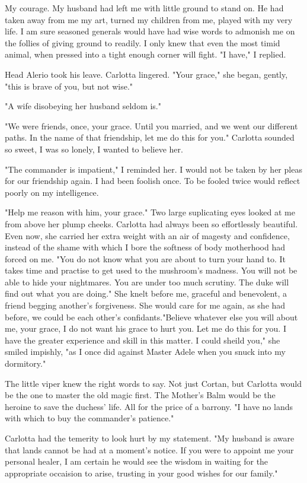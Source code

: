 \documentclass{article}
\begin{document}
My courage. My husband had left me with little ground to stand on. He had taken away from me my art, turned my children from me, played with my very life. I am sure seasoned generals would have had wise words to admonish me on the follies of giving ground to readily. I only knew that even the most timid animal, when pressed into a tight enough corner will fight. "I have," I replied.

Head Alerio took his leave. Carlotta lingered. "Your grace," she began, gently, "this is brave of you, but not wise."

"A wife disobeying her husband seldom is."

"We were friends, once, your grace. Until you married, and we went our different paths. In the name of that friendship, let me do this for you." Carlotta sounded so sweet, I was so lonely, I wanted to believe her.

"The commander is impatient," I reminded her. I would not be taken by her pleas for our friendship again. I had been foolish once. To be fooled twice would reflect poorly on my intelligence.

"Help me reason with him, your grace." Two large suplicating eyes looked at me from above her plump cheeks. Carlotta had always been so effortlessly beautiful. Even now, she carried her extra weight with an air of magesty and confidence, instead of the shame with which I bore the softness of body motherhood had forced on me. "You do not know what you are about to turn your hand to. It takes time and practise to get used to the mushroom's madness. You will not be able to hide your nightmares. You are under too much scrutiny. The duke will find out what you are doing." She knelt before me, graceful and benevolent, a friend begging another's forgiveness. She would care for me again, as she had before, we could be each other's confidants."Believe whatever else you will about me, your grace, I do not want his grace to hurt you. Let me do this for you. I have the greater experience and skill in this matter. I could sheild you," she smiled impishly, "as I once did against Master Adele when you snuck into my dormitory."

The little viper knew the right words to say. Not just Cortan, but Carlotta would be the one to master the old magic first. The Mother's Balm would be the heroine to save the duchess' life. All for the price of a barrony. "I have no lands with which to buy the commander's patience."

Carlotta had the temerity to look hurt by my statement. "My husband is aware that lands cannot be had at a moment's notice. If you were to appoint me your personal healer, I am certain he would see the wisdom in waiting for the appropriate occaision to arise, trusting in your good wishes for our family."
\end{document}
